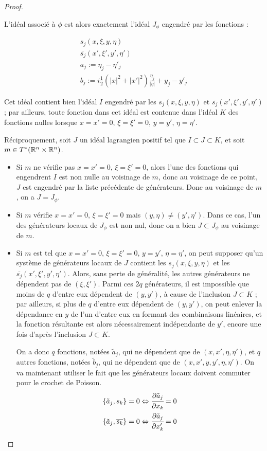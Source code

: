 \begin{proof}
\begin{enumerate}
  L'idéal associé à $\phi$ est alors exactement l'idéal $J_{\phi}$ engendré par les fonctions :
  
  \begin{align*}
    s_j(x,\xi,y,\eta)\\
    \overline{s_j}(x',\xi',y',\eta')\\
    a_j := \eta_j - \eta'_j\\
    b_j := i \frac 12 (|x|^2 + |x'|^2)\frac{\eta_j}{|\eta|} + y_j-y'_j
  \end{align*}
  
  Cet idéal contient bien l'idéal $I$ engendré par les $s_j(x,\xi,y,\eta)$ et $\overline{s_j}(x',\xi',y',\eta')$ ; par ailleurs, toute fonction dans cet idéal est contenue dans l'idéal $K$ des fonctions nulles lorsque $x=x'=0,\,\xi=\xi'=0,\,y=y',\,\eta=\eta'$.
  
Réciproquement, soit $J$ un idéal lagrangien positif tel que $I \subset J \subset K$, et soit $m \in T^*(\mathbb{R}^n \times \mathbb{R}^n)$.

\begin{itemize}
  \item Si $m$ ne vérifie pas $x=x'=0,\,\xi=\xi'=0$, alors l'une des fonctions qui engendrent $I$ est non nulle au voisinage de $m$, donc au voisinage de ce point, $J$ est engendré par la liste précédente de générateurs. Donc au voisinage de $m$, on a $J=J_{\phi}$.
  \item Si $m$ vérifie $x=x'=0,\, \xi=\xi'=0$ mais $(y,\eta) \neq (y', \eta')$. Dans ce cas, l'un des générateurs locaux de $J_{\phi}$ est non nul, donc on a bien $J \subset J_{\phi}$ au voisinage de $m$.
  
  \item Si $m$ est tel que $x=x'=0,\,\xi=\xi'=0,\,y=y',\,\eta=\eta'$, on peut supposer qu'un système de générateurs locaux de $J$ contient les $s_j(x,\xi,y,\eta)$ et les $\overline{s_j}(x',\xi',y',\eta')$. Alors, sans perte de généralité, les autres générateurs ne dépendent pas de $(\xi,\xi')$. Parmi ces $2q$ générateurs, il est impossible que moins de $q$ d'entre eux dépendent de $(y,y')$, à cause de l'inclusion $J \subset K$ ; par ailleurs, si plus de $q$ d'entre eux dépendent de $(y,y')$, on peut enlever la dépendance en $y$ de l'un d'entre eux en formant des combinaisons linéaires, et la fonction résultante est alors nécessairement indépendante de $y'$, encore une fois d'après l'inclusion $J \subset K$.

On a donc $q$ fonctions, notées $\tilde{a}_j$, qui ne dépendent que de $(x,x',\eta,\eta')$, et $q$ autres fonctions, notées $\tilde{b}_j$, qui ne dépendent que de $(x,x',y,y',\eta,\eta')$. On va maintenant utiliser le fait que les générateurs locaux doivent commuter pour le crochet de Poisson.
\begin{align*}
  \{\tilde{a}_j,s_k\}=0 \Leftrightarrow \cfrac{\partial \tilde{a}_j}{\partial x_k} =0\\
   \{\tilde{a}_j,\overline{s_k}\}=0 \Leftrightarrow \cfrac{\partial \tilde{a}_j}{\partial x'_k} =0
\end{align*}


\end{itemize}
\end{enumerate}
\end{proof}
